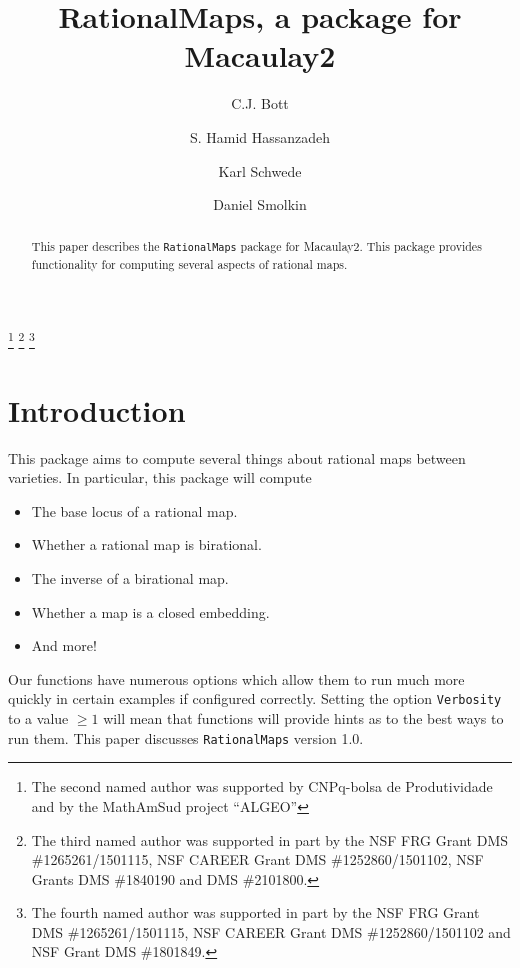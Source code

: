 \documentclass[11pt]{amsart}%
\numberwithin{equation}{theorem}
\renewcommand{\:}{\colon}
\theoremstyle{theorem}
\begin{document}
\title{RationalMaps, a package for Macaulay2}
\author{C.J. Bott}
\author{S. Hamid Hassanzadeh}
\author{Karl Schwede}
\author{Daniel Smolkin}
\address{Department of Mathematics\\Mailstop 3368\\Texas A\&M University\\College Station, TX 77843-3368}
\address{Department of Mathematics\\Federal University of Rio de Janeiro\\Brazil}
\address{Department of Mathematics\\ University of Utah\\ Salt Lake City\\ UT 84112}
\address{Department of Mathematics\\ University of Michigan\\ Ann Arbor\\ UT 48109}

\thanks{The second named author was supported by CNPq-bolsa de Produtividade and by the MathAmSud project ``ALGEO''}
\thanks{The third named author was supported in part by the NSF FRG Grant DMS \#1265261/1501115, NSF CAREER Grant DMS \#1252860/1501102, NSF Grants DMS \#1840190 and DMS \#2101800.}
\thanks{The fourth named author was supported in part by the NSF FRG Grant DMS \#1265261/1501115, NSF CAREER Grant DMS \#1252860/1501102 and NSF Grant DMS \#1801849.}


\begin{abstract}
This paper describes the {\tt RationalMaps} package for Macaulay2.  This package provides functionality for computing several aspects of rational maps.
\end{abstract}
\maketitle


\section{Introduction}


This package aims to compute several things about rational maps between varieties.  In particular, this package will compute
\begin{itemize}
\item{} The base locus of a rational map.
\item{} Whether a rational map is birational.
\item{} The inverse of a birational map.
\item{} Whether a map is a closed embedding.
\item{} And more!
\end{itemize}
Our functions have numerous options which allow them to run much more quickly in certain examples if configured correctly.  Setting the option {\tt Verbosity} to a value $\geq 1$ will mean that functions will provide hints as to the best ways to run them.  This paper discusses {\tt RationalMaps} version 1.0.
\end{document}
